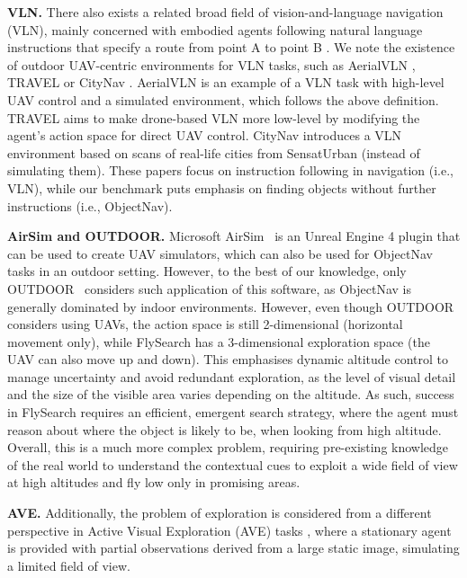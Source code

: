 \documentclass{article}
\theoremstyle{plain}
\theoremstyle{definition}
\theoremstyle{remark}
\newcommand{\objectnav}{ObjectNav}
\begin{document}
\textbf{VLN.} There also exists a related broad field of vision-and-language navigation (VLN), mainly concerned with embodied agents following natural language instructions that specify a route from point A to point B \cite{zhang2024vision}. We note the existence of outdoor UAV-centric environments for VLN tasks, such as AerialVLN \cite{liu2023aerialvln}, TRAVEL \cite{wang2024towards} or CityNav \cite{lee2024citynav}. AerialVLN is an example of a VLN task with high-level UAV control and a simulated environment, which follows the above definition. TRAVEL aims to make drone-based VLN more low-level by modifying the agent’s action space for direct UAV control. CityNav introduces a VLN environment based on scans of real-life cities from SensatUrban \cite{hu2022sensaturban} (instead of simulating them). These papers focus on instruction following in navigation (i.e., VLN), while our benchmark puts emphasis on finding objects without further instructions (i.e., ObjectNav). 

\textbf{AirSim and OUTDOOR.} Microsoft AirSim~\cite{airsim2017fsr} is an Unreal Engine 4 plugin that can be used to create UAV simulators, which can also be used for \objectnav{} tasks in an outdoor setting. However, to the best of our knowledge, only OUTDOOR~\cite{xie2023reasoning} considers such application of this software, as ObjectNav is generally dominated by indoor environments. However, even though OUTDOOR considers using UAVs, the action space is still 2-dimensional (horizontal movement only), while FlySearch has a 3-dimensional exploration space (the UAV can also move up and down). This emphasises dynamic altitude control to manage uncertainty and avoid redundant exploration, as the level of visual detail and the size of the visible area varies depending on the altitude. As such, success in FlySearch requires an efficient, emergent search strategy, where the agent must reason about where the object is likely to be, when looking from high altitude. Overall, this is a much more complex problem, requiring pre-existing knowledge of the real world to understand the contextual cues to exploit a wide field of view at high altitudes and fly low only in promising areas. 

\textbf{AVE.} Additionally, the problem of exploration is considered from a different perspective in Active Visual Exploration (AVE) tasks \cite{pardyl2023active,pardyl2024adaglimpse,seifi2021glimpse}, where a stationary agent is provided with partial observations derived from a large static image, simulating a limited field of view.
\end{document}

